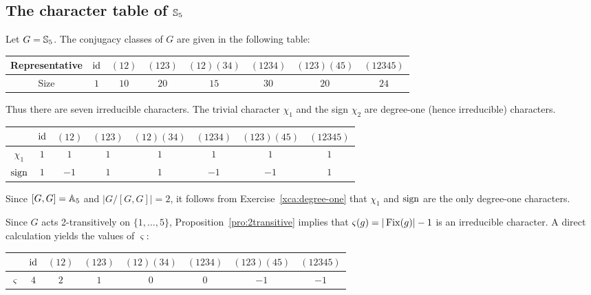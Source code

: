 \subsection{The character table of $\mathbb{S}_5$}
Let $G=\mathbb{S}_5$. The conjugacy classes 
of $G$ are given in the following table:

\bigskip 
\begin{center}
    \begin{tabular}{c|ccccccc}
        Representative & $\operatorname{id}$ & $(12)$ & $(123)$ & $(12)(34)$ & $(1234)$ & $(123)(45)$  & $(12345)$ \\
        \hline 
        Size & $1$ & $10$ & $20$ & $15$ & $30$ & $20$ & $24$ \\
    \end{tabular}
\end{center}
\bigskip 

Thus there are seven irreducible characters. The trivial character $\chi_1$ and the sign $\chi_2$ are degree-one (hence irreducible) 
characters. 

\bigskip 
\begin{center}
    \begin{tabular}{|c|ccccccc|}
        \hline 
        & $\operatorname{id}$ & $(12)$ & $(123)$ & $(12)(34)$ & $(1234)$ & $(123)(45)$  & $(12345)$ \\
        \hline 
        $\chi_1$ & $1$ & $1$ & $1$ & $1$ & $1$ & $1$ & $1$ \\
        $\operatorname{sign}$ & $1$ & $-1$ & $1$ & $1$ & $-1$ & $-1$ & $1$ \\
        \hline 
    \end{tabular}
\end{center}
\bigskip 

Since 
$[G,G]=\mathbb{A}_5$ and $|G/[G,G]|=2$, it follows
from Exercise~\ref{xca:degree-one} that $\chi_1$ and $\operatorname{sign}$ 
are the only degree-one characters. 

Since $G$ acts 2-transitively on $\{1,\dots,5\}$, Proposition~\ref{pro:2transitive} implies that 
$\varsigma(g)=|\operatorname{Fix}(g)|-1$ is an irreducible character. 
A direct
calculation yields the values of $\varsigma$: 
\bigskip 
\begin{center}
    \begin{tabular}{|c|ccccccc|}
        \hline 
        & $\operatorname{id}$ & $(12)$ & $(123)$ & $(12)(34)$ & $(1234)$ & $(123)(45)$  & $(12345)$ \\
        \hline 
        $\varsigma$ & $4$ & $2$ & $1$ & $0$ & $0$ & $-1$ & $-1$ \\
        \hline 
    \end{tabular}
\end{center}
\bigskip 

